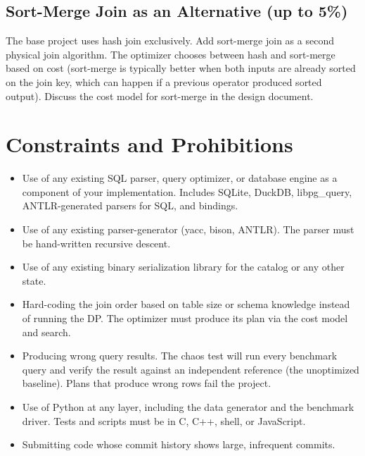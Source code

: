 \documentclass[11pt,a4paper]{article}
\begin{document}
\subsection{Sort-Merge Join as an Alternative (up to 5\%)}
The base project uses hash join exclusively. Add sort-merge join as a second physical join algorithm. The optimizer chooses between hash and sort-merge based on cost (sort-merge is typically better when both inputs are already sorted on the join key, which can happen if a previous operator produced sorted output). Discuss the cost model for sort-merge in the design document.

\section{Constraints and Prohibitions}

\begin{notebox}
\begin{itemize}
\item Use of any existing SQL parser, query optimizer, or database engine as a component of your implementation. Includes SQLite, DuckDB, libpg\_query, ANTLR-generated parsers for SQL, and bindings.

\item Use of any existing parser-generator (yacc, bison, ANTLR). The parser must be hand-written recursive descent.

\item Use of any existing binary serialization library for the catalog or any other state.

\item Hard-coding the join order based on table size or schema knowledge instead of running the DP. The optimizer must produce its plan via the cost model and search.

\item Producing wrong query results. The chaos test will run every benchmark query and verify the result against an independent reference (the unoptimized baseline). Plans that produce wrong rows fail the project.

\item Use of Python at any layer, including the data generator and the benchmark driver. Tests and scripts must be in C, C++, shell, or JavaScript.

\item Submitting code whose commit history shows large, infrequent commits.
\end{itemize}
\end{notebox}
\end{document}

